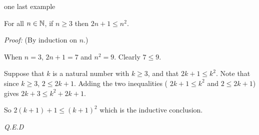 \documentclass[handout,landscape]{beamer}
\begin{document}
\begin{frame}{one last example}
\begin{thm*}
For all $n \in {\mathbb N}$, if $n \geq 3$ then $2n+1 \leq n^2$.
\end{thm*}
\pause

{\em Proof:} (By induction on $n$.) \pause

 When $n=3$, $2n+1 = 7$ and $n^2 = 9$.  Clearly $7 \leq 9$. \pause

 Suppose that $k$ is a natural number 
with $k \geq 3$, and that $2k+1 \leq k^2$. \pause Note that since $k \geq 3$, $2 \leq 2k+1$. \pause
Adding the two inequalities ( $2k+1 \leq k^2$ and $2 \leq 2k+1$) gives $2k+3 \leq k^2 + 2k + 1$. \pause

So $2(k+1)+1 \leq (k+1)^2$ which is the inductive conclusion. \pause

\hfill {\em Q.E.D} 

\end{frame}
\end{document}
